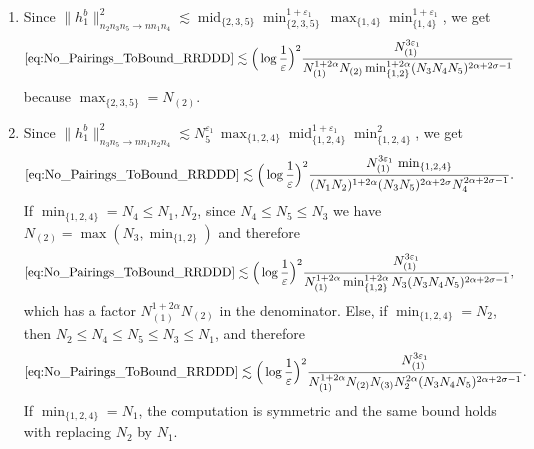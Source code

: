 \documentclass[11pt, xcolor = dvipsnames,reqno
]{amsart}
\theoremstyle{definition}
\theoremstyle{remark}
\begin{document}
\begin{itemize}
\begin{enumerate}
    which holds because either $\operatorname{min}_{\{1,3,5\}}$ or $\operatorname{min}_{\{2,4\}}$ is $N_{(5)}$, and moreover both are $\leq N_{(3)}$, we get
    \begin{align}    
    \eqref{eq:No_Pairings_ToBound_RRDDD} 
    & \lesssim \Big(\log \frac{1}{\varepsilon}\Big)^2
    \frac{N_{(1)}^{3\varepsilon_1} N_{(3)}^2 N_{(5)}^2 }{N_{(1)}^{2+2\alpha}  N_{(2)} N_{(3)} N_{(4)} N_{(5)} \min_{\{1,2\}}^{1+2\alpha}(N_3N_4N_5)^{2 \alpha + 2\sigma - 1} } \\
    & \lesssim \Big(\log \frac{1}{\varepsilon}\Big)^2
    \frac{N_{(1)}^{3\varepsilon_1}}{N_{(1)}^{2+2\alpha} \min_{\{1,2\}}^{1+2\alpha}(N_3N_4N_5)^{2 \alpha + 2\sigma - 1} }.
    \end{align}
    
    \item Since $\lVert  h^b_1 \rVert_{n_2n_3n_5 \to nn_1n_4}^2
    \lesssim
    \operatorname{mid}_{\{2,3,5\}} \operatorname{min}_{\{2,3,5\}}^{1+\varepsilon_1} \, \operatorname{max}_{\{1,4\}} \operatorname{min}_{\{1,4\}}^{1+\varepsilon_1}$, 
    we get
    \begin{align}
    \eqref{eq:No_Pairings_ToBound_RRDDD} &\lesssim \Big(\log \frac{1}{\varepsilon}\Big)^2 \frac{N_{(1)}^{3\varepsilon_1}}{N_{(1)}^{1 + 2\alpha} N_{(2)} \min_{\{1,2\}}^{1 + 2\alpha} (N_3N_4N_5)^{2 \alpha + 2\sigma - 1} }  
    \end{align}
    because $\max_{\{2,3,5\}} = N_{(2)}$. 

    \item Since $\lVert  h^b_1 \rVert_{n_3n_5 \to nn_1n_2n_4}^2
    \lesssim
    N_5^{\varepsilon_1} \, \max_{\{1,2,4\}} \operatorname{mid}_{\{1,2,4\}}^{1+\varepsilon_1}\operatorname{min}_{\{1,2,4\}}^2$, 
    we get
    \begin{align*}
    \eqref{eq:No_Pairings_ToBound_RRDDD} &\lesssim \Big(\log \frac{1}{\varepsilon}\Big)^2 \frac{N_{(1)}^{3\varepsilon_1} \,  \min_{\{1,2,4\}} }{(N_1N_2)^{1 + 2\alpha}(N_3N_5)^{2 \alpha + 2\sigma}N_4^{2 \alpha + 2\sigma - 1}}. 
    \end{align*}
    If $\min_{\{1,2,4\}} = N_4 \leq N_1, N_2$, since $N_4 \leq N_5 \leq N_3 $ we have $N_{(2)} = \max(N_3, \min_{\{1,2\}})$ 
    and therefore 
\begin{align}
    \eqref{eq:No_Pairings_ToBound_RRDDD} & \lesssim  \Big(\log \frac{1}{\varepsilon}\Big)^2 \frac{N_{(1)}^{3\varepsilon_1}}{N_{(1)}^{1 + 2\alpha} \min_{\{1,2\}}^{1 + 2\alpha} N_3 (N_3N_4N_5)^{2 \alpha + 2\sigma - 1 }}, 
\end{align}
which has a factor $N_{(1)}^{1+2\alpha} N_{(2)}$ in the denominator. 
Else, if $\min_{\{1,2,4\}} = N_2$, then $N_2 \leq N_4 \leq N_5 \leq N_3 \leq N_1$, and therefore
\begin{align}
    \eqref{eq:No_Pairings_ToBound_RRDDD}  \lesssim \Big(\log \frac{1}{\varepsilon}\Big)^2 \frac{N_{(1)}^{3\varepsilon_1} }{N_{(1)}^{1 + 2\alpha} N_{(2)} N_{(3)} N_2^{2\alpha} (N_3N_4N_5)^{2 \alpha + 2\sigma - 1}}.
\end{align}
If $\min_{\{1,2,4\}} = N_1$, the computation is symmetric and the same bound holds with replacing $N_2$ by $N_1$. 
\end{enumerate}


\end{itemize}
\end{document}

